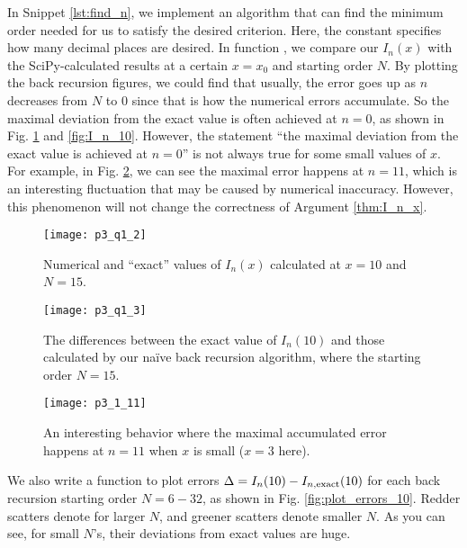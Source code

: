 In Snippet \ref{lst:find_n}, we implement an algorithm that can find the minimum order
needed for us to satisfy the desired criterion.
Here, the constant  specifies how many decimal places are desired.
In function , we compare
our $I_n(x)$ with the SciPy-calculated results at a certain $x = x_0$ and starting order $N$.
By plotting the back recursion figures, we could find that usually, the error goes up
as $n$ decreases from $N$ to $0$ since that is how the numerical errors accumulate.
So the maximal deviation from the exact value is often achieved at $n = 0$, as shown in Fig. \ref{fig:plot_raw}
and \ref{fig:I_n_10}. However, the statement ``the maximal deviation from the exact value
is achieved at $n = 0$'' is not always true for some small values of $x$. For example,
in Fig. \ref{fig:I_n_3}, we can see the maximal error happens at $n = 11$, which is an
interesting fluctuation that may be caused by numerical inaccuracy. However, this phenomenon
will not change the correctness of Argument \ref{thm:I_n_x}.

\begin{figure}
	\centering
	\texttt{[image: p3\_q1\_2]}
	\caption{Numerical and ``exact'' values of $I_n(x)$ calculated at $x = 10$ and $N = 15$.}
	\label{fig:plot_raw}
\end{figure}

\begin{figure} %
    \centering
    \begin{minipage}[t]{0.8\linewidth}
        \centering
        \texttt{[image: p3\_q1\_3]}
        \caption{The differences between the exact value of $I_n(10)$ and those calculated by
            our naïve back recursion algorithm, where the starting order $N = 15$.}
        \label{fig:I_n_10}
    \end{minipage}
    \hfil
    \begin{minipage}[t]{0.8\linewidth}
        \centering
        \texttt{[image: p3\_1\_11]}
        \caption{An interesting behavior where the maximal accumulated error happens at
            $n = 11$ when $x$ is small ($x = 3$ here).}
        \label{fig:I_n_3}
    \end{minipage}
\end{figure}

We also write a function  to
plot errors $\Delta = I_n(10) - I_{n,\textnormal{exact}}(10)$ for each
back recursion starting order $N = 6 - 32$, as shown in Fig. \ref{fig:plot_errors_10}.
Redder scatters denote for larger $N$, and greener scatters denote
smaller $N$. As you can see, for small $N$'s, their deviations from exact values are huge.

